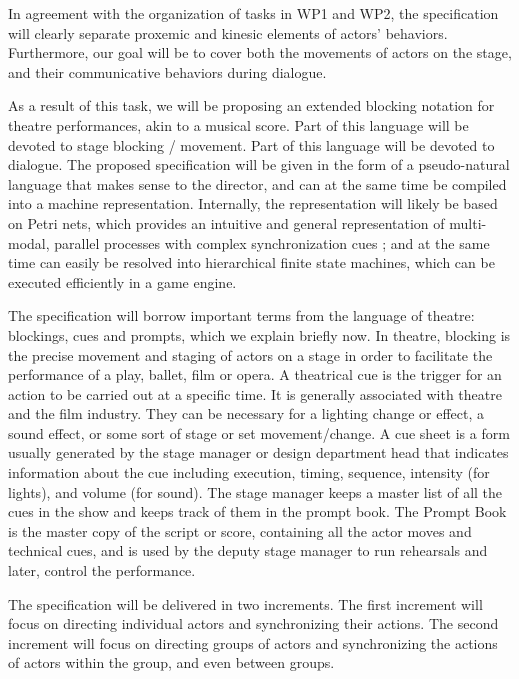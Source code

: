 In agreement with the organization of tasks in WP1 and WP2, the specification will clearly separate proxemic
and kinesic elements of actors' behaviors. Furthermore, our goal will be to cover both the movements of actors
on the stage, and their communicative behaviors during dialogue. 

As a result of this task, we will be proposing an extended blocking notation for theatre performances, akin to a musical score\cite{gagnere2012,ronfard2012,gagnere2015}. Part of this language will be devoted to stage blocking / movement.
Part of this language will be devoted to dialogue. The proposed specification will be given in the form of a pseudo-natural language
that makes sense to the director, and can at the same time be compiled into a machine representation. Internally, the representation
will likely be based on Petri nets, which provides an intuitive and general representation of multi-modal, parallel processes with complex
synchronization cues ; and at the same time can easily be resolved into hierarchical finite state machines, which can be executed efficiently in a game engine.

The specification  will borrow important terms from the language of theatre:  blockings, cues and prompts,  which we explain briefly now. In theatre, blocking is the precise movement and staging of actors on a stage in order to facilitate the performance of a play, ballet, film or opera. A theatrical cue is the trigger for an action to be carried out at a specific time. It is generally associated with theatre and the film industry. They can be necessary for a lighting change or effect, a sound effect, or some sort of stage or set movement/change. A cue sheet is a form usually generated by the stage manager or design department head that indicates information about the cue including execution, timing, sequence, intensity (for lights), and volume (for sound). The stage manager keeps a master list of all the cues in the show and keeps track of them in the prompt book. The Prompt Book is the master copy of the script or score, containing all the actor moves and technical cues,  and is used by the deputy stage manager to run rehearsals and later, control the performance.

The specification will be delivered in two increments. The first increment will focus on directing individual actors and synchronizing
their actions. The second increment will focus on directing groups of actors and synchronizing the actions of actors within the group, and even between groups.

